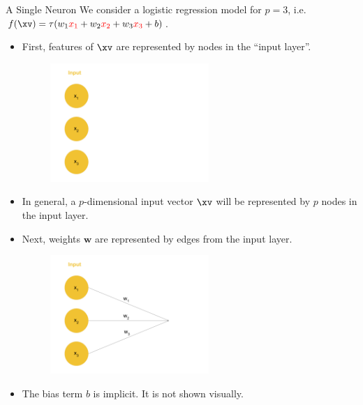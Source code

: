 \begin{vbframe} {A Single Neuron}
We consider a logistic regression model for $p = 3$, i.e. $f(\xv) = \tau(w_1\textcolor{red}{x_1} + w_2\textcolor{red}{x_2} + w_3\textcolor{red}{x_3} + b)$.
\begin{itemize}
\item First, features of $\xv$ are represented by nodes in the \enquote{input layer}.
\begin{figure}
\includegraphics[width=6cm]{figure/neurep_one.png}
\end{figure}
\item In general, a $p$-dimensional input vector $\xv$ will be represented by $p$ nodes in the input layer.
\framebreak

\item Next, weights $\mathbf{w}$ are represented by edges from the input layer.
\begin{figure}
\includegraphics[width=6cm]{figure/neurep_two.png}
\end{figure}
\item The bias term $b$ is implicit. It is not shown visually.
\end{itemize}
\framebreak


\end{vbframe}
